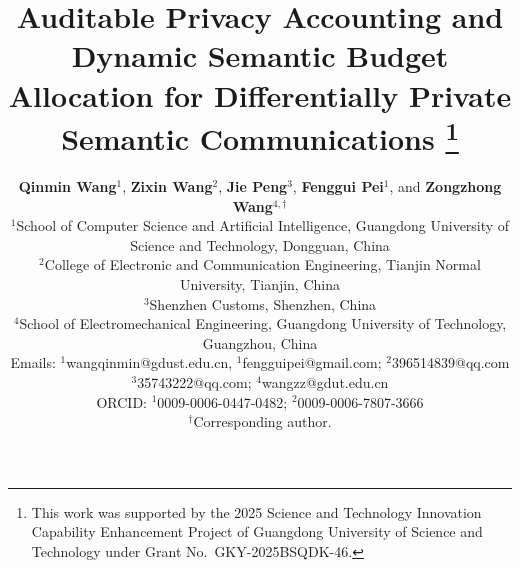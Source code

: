 \documentclass[10pt,twocolumn,letterpaper]{article}
\theoremstyle{plain}
\theoremstyle{definition}
\begin{document}
\title{Auditable Privacy Accounting and Dynamic Semantic Budget Allocation
for Differentially Private Semantic Communications%
\thanks{This work was supported by the 2025 Science and Technology
Innovation Capability Enhancement Project of Guangdong University of Science
and Technology under Grant No.~GKY-2025BSQDK-46.}}

\author{%
\parbox{0.97\textwidth}{\centering\small
\textbf{Qinmin Wang}$^{1}$, \textbf{Zixin Wang}$^{2}$,
\textbf{Jie Peng}$^{3}$, \textbf{Fenggui Pei}$^{1}$,
and \textbf{Zongzhong Wang}$^{4,\dagger}$\\[3pt]
$^{1}$School of Computer Science and Artificial Intelligence, Guangdong
University of Science and Technology, Dongguan, China\\
$^{2}$College of Electronic and Communication Engineering, Tianjin Normal
University, Tianjin, China\\
$^{3}$Shenzhen Customs, Shenzhen, China\\
$^{4}$School of Electromechanical Engineering, Guangdong University of
Technology, Guangzhou, China\\
Emails: $^{1}$wangqinmin@gdust.edu.cn, $^{1}$fengguipei@gmail.com;
$^{2}$396514839@qq.com\\
$^{3}$35743222@qq.com; $^{4}$wangzz@gdut.edu.cn\\
ORCID: $^{1}$0009-0006-0447-0482; $^{2}$0009-0006-7807-3666\\
$^{\dagger}$Corresponding author.}
}
\date{}
\maketitle
\end{document}
